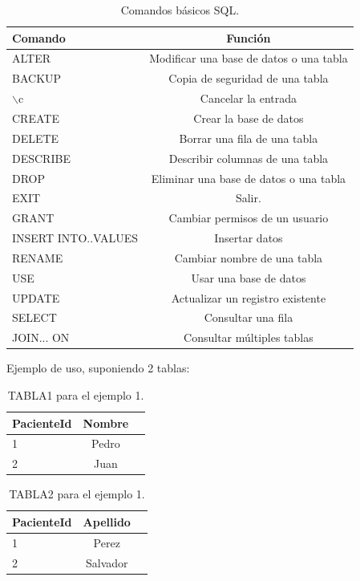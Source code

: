 \begin{table}[h]
	\centering
	\caption[Comandos SQL]{Comandos básicos SQL.}
	\begin{tabular}{l c }    
		\toprule
		\textbf{Comando}     & \textbf{Función} \\
		\midrule
		ALTER & Modificar una base de datos o una tabla    \\		
		BACKUP    & Copia de seguridad de una tabla      \\
		$\backslash$c  & Cancelar la entrada\\
		CREATE  & Crear la base de datos\\
		DELETE  & Borrar una fila de una tabla\\
		DESCRIBE  & Describir columnas de una tabla\\
		DROP  & Eliminar una base de datos o una tabla\\
		EXIT & Salir.\\
		GRANT & Cambiar permisos de un usuario\\
		INSERT INTO..VALUES & Insertar datos\\
		RENAME & Cambiar nombre de una tabla\\
		USE & Usar una base de datos\\
		UPDATE & Actualizar un registro existente\\
		SELECT  & Consultar una fila\\
		JOIN... ON & Consultar múltiples tablas\\
		\bottomrule
		\hline
	\end{tabular}
	\label{tab:Funciones SQL}
\end{table}
\pagebreak
Ejemplo de uso, suponiendo 2 tablas:
\begin{frame}

\begin{table}[h]
	\centering
	\caption[Tabla 1 Ejemplo SQL]{TABLA1 para el ejemplo 1.}
	\begin{tabular}{l c c}    
		\toprule
		\textbf{PacienteId}     & \textbf{Nombre} \\
		\midrule
		 1& Pedro    \\		
 		 2& Juan    \\				
		\bottomrule
		\hline
	\end{tabular}
	\label{tab:Ejemplo 1}
\end{table}

\begin{table}[h]
	\centering
	\caption[Tabla 2 Ejemplo SQL]{TABLA2 para el ejemplo 1.}
	\begin{tabular}{l c c}    
		\toprule
		\textbf{PacienteId}     & \textbf{Apellido} \\
		\midrule
		 1& Perez    \\		
 		 2& Salvador    \\	
		\bottomrule
		\hline
	\end{tabular}
	\label{tab:Ejemplo 2}
\end{table}

\end{frame}

